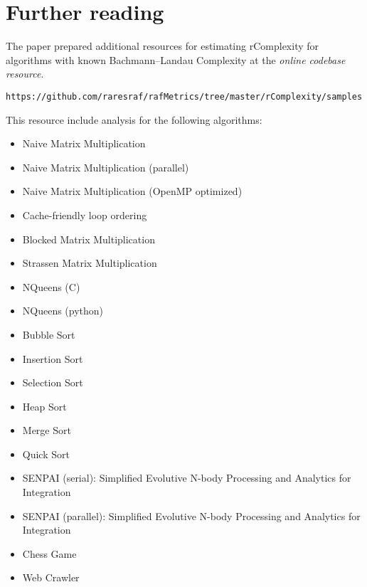 \section{Further reading}
The paper prepared additional resources for estimating rComplexity for algorithms with known Bachmann–Landau Complexity at the \textit{online codebase resource}.
\begin{verbatim}
https://github.com/raresraf/rafMetrics/tree/master/rComplexity/samples
\end{verbatim}
This resource include analysis for the following algorithms:
\begin{itemize}
\item Naive Matrix Multiplication
\item Naive Matrix Multiplication (parallel)	
\item Naive Matrix Multiplication (OpenMP optimized)	
\item Cache-friendly loop ordering
\item Blocked Matrix Multiplication	
\item Strassen Matrix Multiplication	
\item NQueens (C)	
\item NQueens (python)	
\item Bubble Sort	
\item Insertion Sort	
\item Selection Sort	
\item Heap Sort	
\item Merge Sort	
\item Quick Sort	
\item SENPAI (serial): Simplified Evolutive N-body Processing and Analytics for Integration
\item SENPAI (parallel): Simplified Evolutive N-body Processing and Analytics for Integration
\item Chess Game
\item Web Crawler
\end{itemize}

